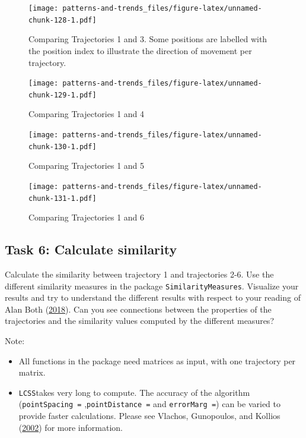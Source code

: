 \documentclass[]{book}
\providecommand{\tightlist}{%
  \setlength{\itemsep}{0pt}\setlength{\parskip}{0pt}}
\begin{document}
\begin{figure}
\centering
\texttt{[image: patterns-and-trends\_files/figure-latex/unnamed-chunk-128-1.pdf]}
\caption{\label{fig:unnamed-chunk-128}Comparing Trajectories 1 and 3. Some positions are labelled with the position index to illustrate the direction of movement per trajectory.}
\end{figure}

\begin{figure}
\centering
\texttt{[image: patterns-and-trends\_files/figure-latex/unnamed-chunk-129-1.pdf]}
\caption{\label{fig:unnamed-chunk-129}Comparing Trajectories 1 and 4}
\end{figure}

\begin{figure}
\centering
\texttt{[image: patterns-and-trends\_files/figure-latex/unnamed-chunk-130-1.pdf]}
\caption{\label{fig:unnamed-chunk-130}Comparing Trajectories 1 and 5}
\end{figure}

\begin{figure}
\centering
\texttt{[image: patterns-and-trends\_files/figure-latex/unnamed-chunk-131-1.pdf]}
\caption{\label{fig:unnamed-chunk-131}Comparing Trajectories 1 and 6}
\end{figure}

\hypertarget{task-6-calculate-similarity}{%
\subsection{Task 6: Calculate similarity}\label{task-6-calculate-similarity}}

Calculate the similarity between trajectory 1 and trajectories 2-6. Use the different similarity measures in the package \texttt{SimilarityMeasures}. Visualize your results and try to understand the different results with respect to your reading of Alan Both (\protect\hyperlink{ref-both2018}{2018}). Can you see connections between the properties of the trajectories and the similarity values computed by the different measures?

Note:

\begin{itemize}
\tightlist
\item
  All functions in the package need matrices as input, with one trajectory per matrix.
\item
  \texttt{LCSS}takes very long to compute. The accuracy of the algorithm (\texttt{pointSpacing\ =} ,\texttt{pointDistance\ =} and \texttt{errorMarg\ =}) can be varied to provide faster calculations. Please see Vlachos, Gunopoulos, and Kollios (\protect\hyperlink{ref-vlachos2002}{2002}) for more information.
\end{itemize}
\end{document}
